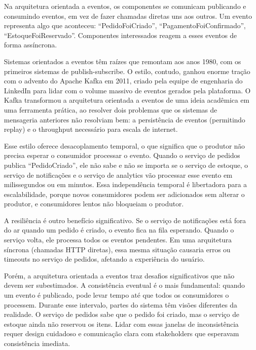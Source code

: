 Na arquitetura orientada a eventos, os componentes se comunicam publicando e
consumindo eventos, em vez de fazer chamadas diretas uns aos outros. Um evento
representa algo que aconteceu: ``PedidoFoiCriado'', ``PagamentoFoiConfirmado'',
``EstoqueFoiReservado''. Componentes interessados reagem a esses eventos de
forma assíncrona.

Sistemas orientados a eventos têm raízes que remontam aos anos 1980,
com os primeiros sistemas de publish-subscribe. O estilo, contudo, ganhou
enorme tração com o advento do Apache Kafka em 2011, criado pela equipe de
engenharia do LinkedIn para lidar com o volume massivo de eventos gerados pela
plataforma. O Kafka transformou a arquitetura orientada a eventos de uma ideia
acadêmica em uma ferramenta prática, ao resolver dois problemas que os sistemas
de mensageria anteriores não resolviam bem: a persistência de eventos (permitindo
replay) e o throughput necessário para escala de internet.

Esse estilo oferece desacoplamento temporal, o que significa que o produtor não
precisa esperar o consumidor processar o evento. Quando o serviço de pedidos
publica ``PedidoCriado'', ele não sabe e não se importa se o serviço de
estoque, o serviço de notificações e o serviço de analytics vão processar esse
evento em milissegundos ou em minutos. Essa independência temporal é libertadora
para a escalabilidade, porque novos consumidores podem ser adicionados sem
alterar o produtor, e consumidores lentos não bloqueiam o produtor.

A resiliência é outro benefício significativo. Se o serviço de notificações está
fora do ar quando um pedido é criado, o evento fica na fila esperando. Quando o
serviço volta, ele processa todos os eventos pendentes. Em uma arquitetura
síncrona (chamadas HTTP diretas), essa mesma situação causaria erros ou
timeouts no serviço de pedidos, afetando a experiência do usuário.

Porém, a arquitetura orientada a eventos traz desafios significativos que não
devem ser subestimados. A consistência eventual é o mais fundamental: quando um
evento é publicado, pode levar tempo até que todos os consumidores o processem.
Durante esse intervalo, partes do sistema têm visões diferentes da realidade. O
serviço de pedidos sabe que o pedido foi criado, mas o serviço de estoque ainda
não reservou os itens. Lidar com essas janelas de inconsistência requer design
cuidadoso e comunicação clara com stakeholders que esperavam consistência
imediata.

